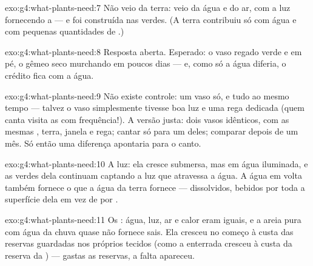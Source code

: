 \begin{solution}{exo:g4:what-plants-need:7}
Não veio da terra: veio da água e do ar, com a luz fornecendo a
 --- e foi construída nas  verdes. (A terra contribuiu
só com água e com pequenas quantidades de .)
\end{solution}

\begin{solution}{exo:g4:what-plants-need:8}
Resposta aberta. Esperado: o vaso regado verde e em pé, o gêmeo seco
murchando em poucos dias --- e, como só a água diferia, o crédito
fica com a água.
\end{solution}

\begin{solution}{exo:g4:what-plants-need:9}
Não existe controle: um vaso só, e tudo ao mesmo tempo --- talvez o
vaso simplesmente tivesse boa luz e uma rega dedicada (quem canta
visita as  com frequência!). A versão justa: dois vasos
idênticos, com as mesmas , terra, janela e rega; cantar só
para um deles; comparar depois de um mês. Só então uma diferença
apontaria para o canto.
\end{solution}

\begin{solution}{exo:g4:what-plants-need:10}
A luz: ela cresce submersa, mas em água iluminada, e as 
verdes dela continuam captando a luz que atravessa a água. A água em
volta também fornece o que a água da terra fornece --- 
dissolvidos, bebidos por toda a superfície dela em vez de por
.
\end{solution}

\begin{solution}{exo:g4:what-plants-need:11}
Os : água, luz, ar e calor eram iguais, e a areia pura
com água da chuva quase não fornece sais. Ela cresceu no começo à
custa das reservas guardadas nos próprios tecidos (como a 
enterrada cresceu à custa da reserva da ) --- gastas as
reservas, a falta apareceu.
\end{solution}
